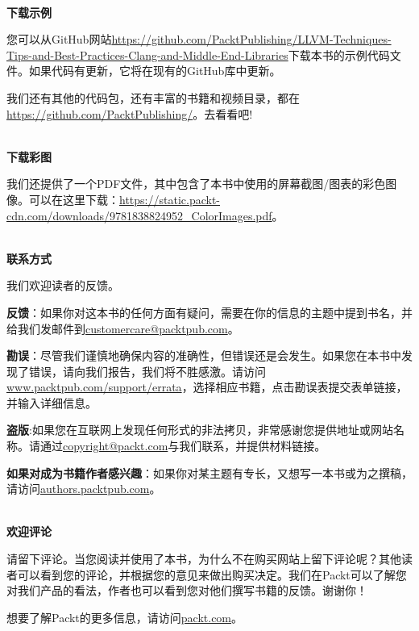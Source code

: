 \hspace*{\fill} \\ %
\textbf{下载示例}

您可以从GitHub网站\url{https://github.com/PacktPublishing/LLVM-Techniques-Tips-and-Best-Practices-Clang-and-Middle-End-Libraries}下载本书的示例代码文件。如果代码有更新，它将在现有的GitHub库中更新。

我们还有其他的代码包，还有丰富的书籍和视频目录，都在\url{https://github.com/PacktPublishing/}。去看看吧!

\hspace*{\fill} \\ %
\textbf{下载彩图}

我们还提供了一个PDF文件，其中包含了本书中使用的屏幕截图/图表的彩色图像。可以在这里下载：\url{https://static.packt-cdn.com/downloads/9781838824952\_ColorImages.pdf}。

\hspace*{\fill} \\ %
\textbf{联系方式}

我们欢迎读者的反馈。

\textbf{反馈}：如果你对这本书的任何方面有疑问，需要在你的信息的主题中提到书名，并给我们发邮件到\url{customercare@packtpub.com}。

\textbf{勘误}：尽管我们谨慎地确保内容的准确性，但错误还是会发生。如果您在本书中发现了错误，请向我们报告，我们将不胜感激。请访问\url{www.packtpub.com/support/errata}，选择相应书籍，点击勘误表提交表单链接，并输入详细信息。

\textbf{盗版}:如果您在互联网上发现任何形式的非法拷贝，非常感谢您提供地址或网站名称。请通过\url{copyright@packt.com}与我们联系，并提供材料链接。

\textbf{如果对成为书籍作者感兴趣}：如果你对某主题有专长，又想写一本书或为之撰稿，请访问\url{authors.packtpub.com}。

\hspace*{\fill} \\ %
\textbf{欢迎评论}

请留下评论。当您阅读并使用了本书，为什么不在购买网站上留下评论呢？其他读者可以看到您的评论，并根据您的意见来做出购买决定。我们在Packt可以了解您对我们产品的看法，作者也可以看到您对他们撰写书籍的反馈。谢谢你！

想要了解Packt的更多信息，请访问\url{packt.com}。

\newpage












